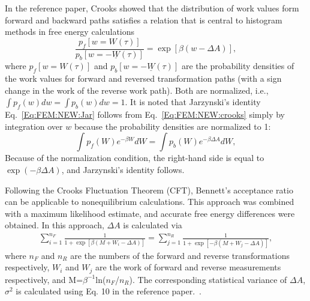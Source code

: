 In the reference paper\cite{CrooksJSP1998}, Crooks showed that the distribution of work values form forward and backward paths satisfies a relation that is central to histogram methods in free energy calculations
\begin{equation}
\frac{p_{f}[w=W(\tau)]}{p_{b}[w=-\underline{W}(\tau)]}=\exp[\beta(w-\Delta A)],
\label{Eq:FEM:NEW:crooks}
\end{equation}
where $p_{f}[w=W(\tau)]$ and $p_{b}[w=-\underline{W}(\tau)]$ are the probability densities of the work values for forward and reversed transformation paths (with a sign change in the work of the reverse work path). Both are normalized, i.e., $\int p_{f}(w) dw=\int p_{b}(w) dw=1$. It is noted that Jarzynski's identity Eq.~\ref{Eq:FEM:NEW:Jar} follows from Eq.~\ref{Eq:FEM:NEW:crooks} simply by integration over $w$ because the probability densities are normalized to 1:
\begin{equation}
\int p_{f}(W)e^{-\beta W}dW=\int p_{b}(W)e^{-\beta \Delta A}dW,
\label{Eq:FEM:NEW:crookstojar}
\end{equation}
Because of the normalization condition, the right-hand side is equal to $\exp(-\beta \Delta A)$, and Jarzynski's identity follows.

Following the Crooks Fluctuation Theorem (CFT),\cite{CrooksJSP1998} Bennett’s acceptance ratio can be applicable to nonequilibrium calculations. This approach was combined with a maximum likelihood estimate, and accurate free energy differences were obtained.\cite{ShirtsPRL2003}
In this approach, $\Delta A$ is calculated via
\begin{align}
\sum_{i=1}^{n_{F}}\frac{1}{1+\exp \left[\beta(M+W_{i}-\Delta A)\right]} = \sum_{j=1}^{n_{R}}\frac{1}{1+\exp \left[-\beta(M+W_{j}-\Delta A)\right]},
\label{Eq:FEM:NEW:NEBAR}
\end{align}
where $n_{F}$ and $n_{R}$ are the numbers of the forward and reverse transformations respectively, $W_{i}$ and $W_{j}$ are the work of forward and reverse measurements respectively, and M=$\beta^{-1}$ln($n_{F}$/$n_{R}$).
The corresponding statistical variance of $ \Delta A $, $ \sigma^2 $ is calculated using Eq. 10 in the reference paper.~\cite{ShirtsPRL2003}.